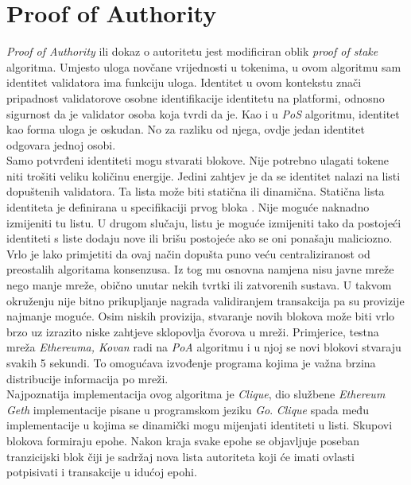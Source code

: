 \documentclass[times, utf8, zavrsni, numeric]{fer}
\begin{document}
\section{Proof of Authority}
\emph{Proof of Authority} ili dokaz o autoritetu jest modificiran oblik \emph{proof of stake} algoritma. Umjesto uloga novčane vrijednosti u tokenima, u ovom algoritmu
sam identitet validatora ima funkciju uloga. Identitet u ovom kontekstu znači pripadnost validatorove osobne identifikacije identitetu na platformi, odnosno
sigurnost da je validator osoba koja tvrdi da je. Kao i u \emph{PoS} algoritmu, identitet kao forma uloga je oskudan. No za razliku od njega, ovdje jedan identitet odgovara
jednoj osobi.\citep{poa1} \\
Samo potvrđeni identiteti mogu stvarati blokove. Nije potrebno ulagati tokene niti trošiti veliku količinu energije. Jedini zahtjev je da se identitet nalazi na listi
dopuštenih validatora. Ta lista može biti statična ili dinamična. Statična lista identiteta je definirana u specifikaciji prvog bloka . Nije moguće naknadno
izmijeniti tu listu. U drugom slučaju, listu je moguće izmijeniti tako da postojeći identiteti s liste dodaju nove ili brišu postojeće ako se oni ponašaju maliciozno.\citep{poa2} \\
Vrlo je lako primjetiti da ovaj način dopušta puno veću centraliziranost od preostalih algoritama konsenzusa. Iz tog mu osnovna namjena nisu javne mreže nego manje mreže,
obično unutar nekih tvrtki ili zatvorenih sustava. U takvom okruženju nije bitno prikupljanje nagrada validiranjem transakcija pa su provizije najmanje moguće.
Osim niskih provizija, stvaranje novih blokova može biti vrlo brzo uz izrazito niske zahtjeve sklopovlja čvorova u mreži. Primjerice, testna mreža \emph{Ethereuma, Kovan}
radi na \emph{PoA} algoritmu i u njoj se novi blokovi stvaraju svakih 5 sekundi. To omogućava izvođenje programa kojima je važna brzina distribucije informacija po mreži. \\
Najpoznatija implementacija ovog algoritma je \emph{Clique}, dio službene \emph{Ethereum Geth} implementacije pisane u programskom jeziku \emph{Go}.
\emph{Clique} spada među implementacije u kojima se dinamički mogu mijenjati identiteti u listi. Skupovi blokova formiraju epohe. Nakon kraja svake epohe se objavljuje
poseban tranzicijski blok čiji je sadržaj nova lista autoriteta koji će imati ovlasti potpisivati i transakcije u idućoj epohi.
\end{document}
